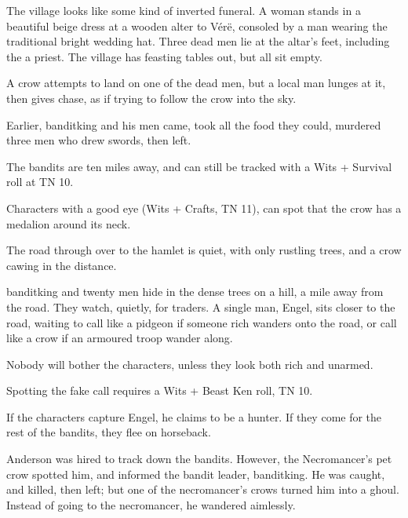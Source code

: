 \begin{multicols}{2}

\begin{boxtext}

	The village looks like some kind of inverted funeral.  A woman stands in a beautiful beige dress at a wooden alter to V\'{e}r\"{e}, consoled by a man wearing the traditional bright wedding hat.  Three dead men lie at the altar's feet, including the a priest.  The village has feasting tables out, but all sit empty.

	A crow attempts to land on one of the dead men, but a local man lunges at it, then gives chase, as if trying to follow the crow into the sky.

\end{boxtext}

Earlier, \gls{banditking} and his men came, took all the food they could, murdered three men who drew swords, then left.

The bandits are ten miles away, and can still be tracked with a Wits + Survival roll at TN 10.

Characters with a good eye (Wits + Crafts, TN 11), can spot that the crow has a medalion around its neck.


\begin{boxtext}

	The road through over to the hamlet is quiet, with only rustling trees, and a crow cawing in the distance.

\end{boxtext}

\gls{banditking} and twenty men hide in the dense trees on a hill, a mile away from the road.  They watch, quietly, for traders.  A single man, Engel, sits closer to the road, waiting to call like a pidgeon if someone rich wanders onto the road, or call like a crow if an armoured troop wander along.

Nobody will bother the characters, unless they look both rich and unarmed.

Spotting the fake call requires a Wits + Beast Ken roll, TN 10.

If the characters capture Engel, he claims to be a hunter.
If they come for the rest of the bandits, they flee on horseback.


\humansoldier


Anderson was hired to track down the bandits.  However, the Necromancer's pet crow spotted him, and informed the bandit leader, \gls{banditking}.  He was caught, and killed, then left; but one of the necromancer's crows turned him into a ghoul.  Instead of going to the necromancer, he wandered aimlessly.


\end{multicols}
